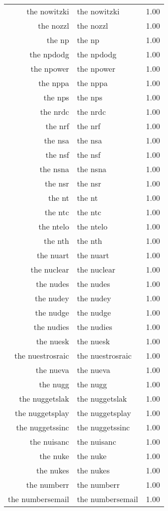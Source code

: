 \begin{table}[ht]
\begin{tabular}{rlr}
  the nowitzki & the nowitzki & 1.00 \\ 
  the nozzl & the nozzl & 1.00 \\ 
  the np & the np & 1.00 \\ 
  the npdodg & the npdodg & 1.00 \\ 
  the npower & the npower & 1.00 \\ 
  the nppa & the nppa & 1.00 \\ 
  the nps & the nps & 1.00 \\ 
  the nrdc & the nrdc & 1.00 \\ 
  the nrf & the nrf & 1.00 \\ 
  the nsa & the nsa & 1.00 \\ 
  the nsf & the nsf & 1.00 \\ 
  the nsna & the nsna & 1.00 \\ 
  the nsr & the nsr & 1.00 \\ 
  the nt & the nt & 1.00 \\ 
  the ntc & the ntc & 1.00 \\ 
  the ntelo & the ntelo & 1.00 \\ 
  the nth & the nth & 1.00 \\ 
  the nuart & the nuart & 1.00 \\ 
  the nuclear & the nuclear & 1.00 \\ 
  the nudes & the nudes & 1.00 \\ 
  the nudey & the nudey & 1.00 \\ 
  the nudge & the nudge & 1.00 \\ 
  the nudies & the nudies & 1.00 \\ 
  the nuesk & the nuesk & 1.00 \\ 
  the nuestrosraic & the nuestrosraic & 1.00 \\ 
  the nueva & the nueva & 1.00 \\ 
  the nugg & the nugg & 1.00 \\ 
  the nuggetslak & the nuggetslak & 1.00 \\ 
  the nuggetsplay & the nuggetsplay & 1.00 \\ 
  the nuggetssinc & the nuggetssinc & 1.00 \\ 
  the nuisanc & the nuisanc & 1.00 \\ 
  the nuke & the nuke & 1.00 \\ 
  the nukes & the nukes & 1.00 \\ 
  the numberr & the numberr & 1.00 \\ 
  the numbersemail & the numbersemail & 1.00 \\ 

\end{tabular}
\end{table}
